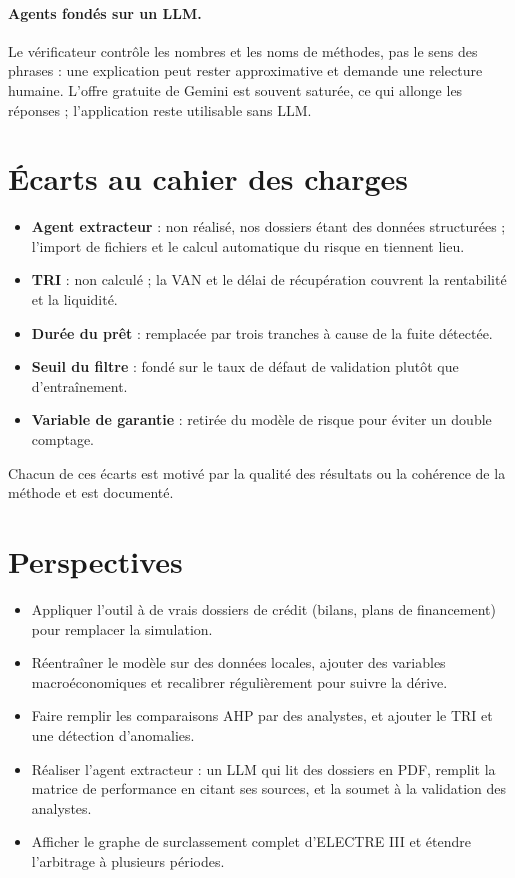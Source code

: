 \paragraph{Agents fondés sur un LLM.} Le vérificateur contrôle les nombres et les noms de méthodes, pas le sens des
phrases : une explication peut rester approximative et demande une relecture humaine. L'offre gratuite de Gemini est
souvent saturée, ce qui allonge les réponses ; l'application reste utilisable sans LLM.

\section{Écarts au cahier des charges}

\begin{itemize}
  \item \textbf{Agent extracteur} : non réalisé, nos dossiers étant des données structurées ; l'import de fichiers et
        le calcul automatique du risque en tiennent lieu.
  \item \textbf{TRI} : non calculé ; la VAN et le délai de récupération couvrent la rentabilité et la liquidité.
  \item \textbf{Durée du prêt} : remplacée par trois tranches à cause de la fuite détectée.
  \item \textbf{Seuil du filtre} : fondé sur le taux de défaut de validation plutôt que d'entraînement.
  \item \textbf{Variable de garantie} : retirée du modèle de risque pour éviter un double comptage.
\end{itemize}
Chacun de ces écarts est motivé par la qualité des résultats ou la cohérence de la méthode et est documenté.

\section{Perspectives}

\begin{itemize}
  \item Appliquer l'outil à de vrais dossiers de crédit (bilans, plans de financement) pour remplacer la simulation.
  \item Réentraîner le modèle sur des données locales, ajouter des variables macroéconomiques et recalibrer
        régulièrement pour suivre la dérive.
  \item Faire remplir les comparaisons AHP par des analystes, et ajouter le TRI et une détection d'anomalies.
  \item Réaliser l'agent extracteur : un LLM qui lit des dossiers en PDF, remplit la matrice de performance en citant
        ses sources, et la soumet à la validation des analystes.
  \item Afficher le graphe de surclassement complet d'ELECTRE III et étendre l'arbitrage à plusieurs périodes.
\end{itemize}
